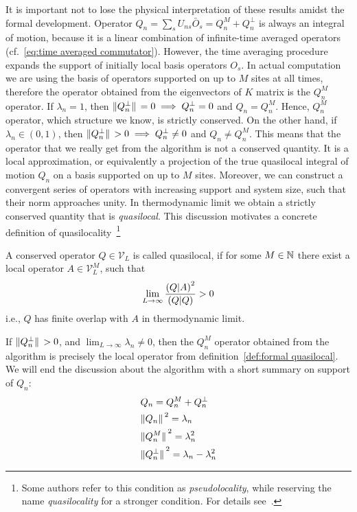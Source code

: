 It is important not to lose the physical interpretation of these results amidst the formal development.
Operator \(Q_n = \sum_s U_{ns}\bar{O}_{s} = Q_n^M + Q_n^{\perp} \) is always an integral of motion, 
because it is a linear combination of infinite-time averaged operators (cf.~\eqref{eq:time averaged commutator}).
However, the time averaging procedure expands the support of initially local basis operators \(O_s\).
In actual computation we are using the basis of operators supported on up to \(M\) sites at all times, therefore the operator
obtained from the eigenvectors of \(K\) matrix is the \(Q_n^M\) operator. If \(\lambda_n = 1\), then
\(\norm*{Q_n^{\perp}} = 0 \implies Q_n^{\perp} = 0\) and \(Q_n = Q_n^M\). Hence, \(Q_n^M\) operator, which
structure we know, is strictly conserved. On the other hand, if \(\lambda_n \in (0,1) \), then
\(\norm*{Q_n^{\perp}} > 0 \implies Q_n^{\perp} \neq 0\) and \(Q_n \neq Q_n^M\). This means that the operator
that we really get from the algorithm is not a conserved quantity. It is a local approximation, or equivalently
a projection of the true quasilocal integral of motion \(Q_n\) on a basis supported on up to \(M\) sites. Moreover, we can 
construct a convergent series of operators with increasing support and system size, such that their
norm approaches unity. In thermodynamic limit we obtain a strictly conserved
quantity that is \textit{quasilocal}. This discussion motivates a concrete definition
of quasilocality~\footnote{Some authors refer to this condition as \textit{pseudolocality},
while reserving the name \textit{quasilocality} for a stronger condition. For details
see~\textcite{Ilievski2016a}.}~\autocite{Mierzejewski2020b}
\begin{definition}[Quasilocality]
A conserved operator \(Q\in \mathcal{V}_L\) is called quasilocal, if for some \(M\in \mathbb{N}\)
there exist a local operator \(A \in \mathcal{V}_L^M \), such that
\begin{equation*}
  \lim_{L\to \infty} \frac{\left(Q \middle| A\right)^2}{\left(Q \middle| Q\right)} > 0
\end{equation*}
i.e., \(Q\) has finite overlap with \(A\) in thermodynamic limit.
  \label{def:formal quasilocal}
\end{definition}
If \(\norm*{Q_n^{\perp}} > 0\), and \(\lim_{L\to \infty} \lambda_n \neq 0\),
then the \(Q_n^M\) operator obtained from the algorithm is precisely the local operator from
definition~\ref{def:formal quasilocal}.
We will end the discussion about the algorithm with 
a short summary on support of \(Q_n\):
\begin{align}
  & Q_n = Q_n^M + Q_n^{\perp}\nonumber\\
  & \norm*{Q_n}^2 = \lambda_n \nonumber\\
  & \norm*{Q_n^M}^2 = \lambda_n^2 \nonumber\\
  & \norm*{Q_n^{\perp}}^2 = \lambda_n - \lambda_n^2
  \label{eq:summary of support}
\end{align}

